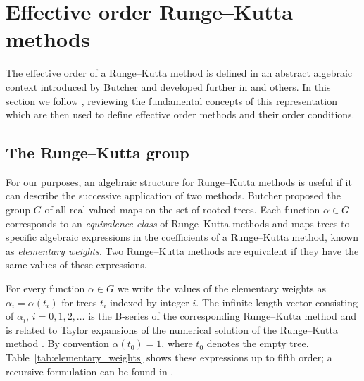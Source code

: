 \section{Effective order Runge--Kutta methods}\label{sec:Algebraic_RK}

The effective order of a Runge--Kutta method is defined in an abstract algebraic
context introduced by Butcher \cite{Butcher1969} and developed further in
\cite{Butcher1972, Hairer1974, Butcher1996, Butcher1998} and others.
In this section we follow \cite{Butcher2008_book}, reviewing the fundamental
concepts of this representation which are then used to define
effective order methods and their order conditions.


\subsection{The Runge--Kutta group}\label{sec:RK_group}


For our purposes, an algebraic structure for Runge--Kutta methods is useful if it can describe
the successive application of two methods.
Butcher \cite{Butcher1972} proposed the group $G$ of all real-valued maps on the
set of rooted trees.
Each function $\alpha \in G$ corresponds
to an \emph{equivalence class} of Runge--Kutta methods and maps trees to specific
algebraic expressions in the coefficients
of a Runge--Kutta method, known as \emph{elementary weights}.
Two Runge--Kutta methods are equivalent if they have the same values of these expressions.


For every function $\alpha \in G$ we write the values of the
elementary weights as $\alpha_{i} = \alpha(t_{i})$ for trees $t_{i}$
indexed by integer $i$.
The infinite-length vector consisting of $\alpha_i$, $i = 0, 1, 2,\ldots$ is the B-series
of the corresponding Runge--Kutta method and is related to Taylor expansions of the numerical solution of the Runge--Kutta method \cite{Hairer1974, Butcher2008_book}. 
By convention $\alpha(t_{0}) = 1$, where $t_{0}$ denotes the empty tree. 
Table~\ref{tab:elementary_weights} shows these expressions up to fifth order; a recursive formulation can be found in \cite[Definition 312]{Butcher2008_book}. 

